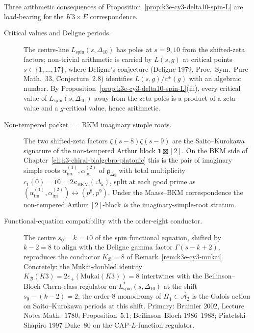 \begin{remark}[Arithmetic consequences: Deligne periods, BKM imaginary simple roots, \texorpdfstring{$K^{\kappa_{\mathrm{ch}}} = 8$}{K-kappa-ch = 8} ceiling]
\label{rem:k3e-cy3-delta10-arithmetic-B-family}
Three arithmetic consequences of Proposition~\ref{prop:k3e-cy3-delta10-spin-L} are load-bearing for the $K3 \times E$ correspondence.
\begin{description}
 \item[Critical values and Deligne periods.] The centre-line $L_{\mathrm{spin}}(s, \Delta_{10})$ has poles at $s = 9, 10$ from the shifted-zeta factors; non-trivial arithmetic is carried by $L(s, g)$ at critical points $s \in \{1, \dots, 17\}$, where Deligne's conjecture \textup{(}Deligne 1979, Proc.\ Sym.\ Pure Math.~33, Conjecture~$2.8$\textup{)} identifies $L(s, g)/c^\pm(g)$ with an algebraic number. By Proposition~\ref{prop:k3e-cy3-delta10-spin-L}(iii), every critical value of $L_{\mathrm{spin}}(s, \Delta_{10})$ away from the zeta poles is a product of a zeta-value and a $g$-critical value, hence arithmetic.
 \item[Non-tempered packet $=$ BKM imaginary simple roots.] The two shifted-zeta factors $\zeta(s-8)\zeta(s-9)$ are the Saito--Kurokawa signature of the non-tempered Arthur block $\mathbf{1} \boxtimes [2]$. On the BKM side of Chapter~\ref{ch:k3-chiral-bialgebra-platonic} this is the pair of imaginary simple roots $\alpha_{\mathrm{im}}^{(1)}, \alpha_{\mathrm{im}}^{(2)}$ of $\mathfrak{g}_{\Delta_5}$ with total multiplicity $c_1(0) = 10 = 2\kappa_{\mathrm{BKM}}(\Delta_5)$, split at each good prime as $(\alpha_{\mathrm{im}}^{(1)}, \alpha_{\mathrm{im}}^{(2)}) \leftrightarrow (p^8, p^9)$. Under the Maass--BKM correspondence the non-tempered Arthur $[2]$-block \emph{is} the imaginary-simple-root stratum.
 \item[Functional-equation compatibility with the order-eight conductor.] The centre $s_0 = k = 10$ of the spin functional equation, shifted by $k - 2 = 8$ to align with the Deligne gamma factor $\Gamma(s - k + 2)$, reproduces the conductor $K_{\mathcal B}=8$ of Remark~\ref{rem:k3e-cy3-mukai}. Concretely: the Mukai-doubled identity $K_{\mathcal B}(K3) = 2 c_+(\mathrm{Mukai}(K3)) = 8$ intertwines with the Beilinson--Bloch Chern-class regulator on $L^*_{\mathrm{spin}}(s, \Delta_{10})$ at the shift $s_0 - (k-2) = 2$; the order-$8$ monodromy of $H_1 \subset \overline{\mathcal{A}_2}$ is the Galois action on Saito--Kurokawa periods at this shift. Primary: Bruinier 2002, Lecture Notes Math.~$1780$, Proposition~$5.1$; Beilinson--Bloch 1986--1988; Piatetski-Shapiro 1997 Duke~$80$ on the CAP-$L$-function regulator.

\end{description}
\end{remark}
